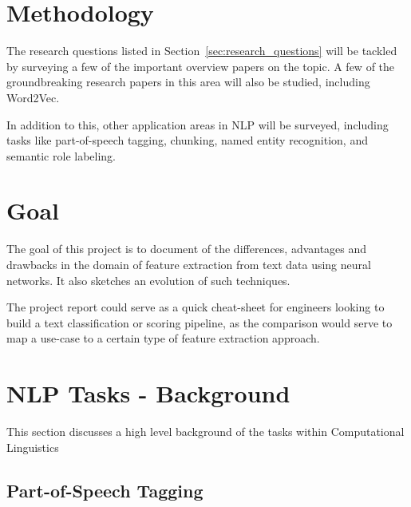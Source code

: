 \documentclass[11pt,a4paper]{article}
\begin{document}

\section{Methodology} %
\label{sec:methodology}

  The research questions listed in Section~\ref{sec:research_questions} will be tackled by surveying a few of the important overview papers on the topic\cite{goldberg2016primer}\cite{bengio2003neural}\cite{morin2005hierarchical}. A few of the groundbreaking research papers in this area will also be studied, including Word2Vec\cite{mikolov2013efficient}\cite{mikolov2013distributed}\cite{mikolov2013linguistic}.

  In addition to this, other application areas in NLP will be surveyed, including tasks like part-of-speech tagging, chunking, named entity recognition, and semantic role labeling. \cite{socher2011parsing}\cite{luong2013better}\cite{maas2015lexicon}\cite{li2015hierarchical}\cite{collobert2011natural}\cite{pennington2014glove}


\section{Goal} %
\label{sec:goal}

  The goal of this project is to document of the differences, advantages and drawbacks in the domain of feature extraction from text data using neural networks. It also sketches an evolution of such techniques.

  The project report could serve as a quick cheat-sheet for engineers looking to build a text classification or scoring pipeline, as the comparison would serve to map a use-case to a certain type of feature extraction approach.



\section{NLP Tasks - Background} %
\label{sec:nlp_tasks_background}

  This section discusses a high level background of the tasks within Computational Linguistics

  \subsection{Part-of-Speech Tagging} %
  \label{sub:part_of_speech_tagging}
\end{document}
